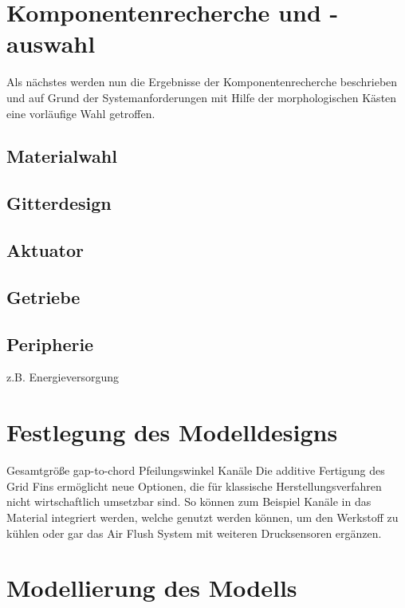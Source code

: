 \section{Komponentenrecherche und -auswahl}
Als nächstes werden nun die Ergebnisse der Komponentenrecherche beschrieben und auf Grund der Systemanforderungen mit Hilfe der morphologischen Kästen eine vorläufige Wahl getroffen.
\subsection{Materialwahl}
\subsection{Gitterdesign}
\subsection{Aktuator}
\subsection{Getriebe}
\subsection{Peripherie}
z.B. Energieversorgung

\section{Festlegung des Modelldesigns}\label{sec:modelldesign}
Gesamtgröße
gap-to-chord
Pfeilungswinkel
Kanäle
Die additive Fertigung des Grid Fins ermöglicht neue Optionen, die für klassische Herstellungsverfahren nicht wirtschaftlich umsetzbar sind. So können zum Beispiel Kanäle in das Material integriert werden, welche genutzt werden können, um den Werkstoff zu kühlen oder gar das Air Flush System mit weiteren Drucksensoren ergänzen.

\section{Modellierung des Modells}